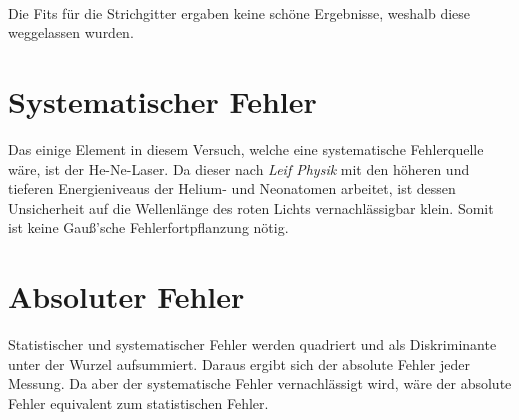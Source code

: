 \\[0.5cm]
Die Fits für die Strichgitter ergaben keine schöne Ergebnisse, weshalb diese weggelassen wurden.

\newpage
\section{Systematischer Fehler}
Das einige Element in diesem Versuch, welche eine systematische Fehlerquelle wäre, ist der He-Ne-Laser. Da dieser nach \textit{Leif Physik} \cite{PhysikkeineAngaben} mit den höheren und tieferen Energieniveaus der Helium- und Neonatomen arbeitet, ist dessen Unsicherheit auf die Wellenlänge des roten Lichts vernachlässigbar klein. Somit ist keine Gauß'sche Fehlerfortpflanzung nötig.
\section{Absoluter Fehler}
Statistischer und systematischer Fehler werden quadriert und als Diskriminante unter der Wurzel aufsummiert. Daraus ergibt sich der absolute Fehler jeder Messung. Da aber der systematische Fehler vernachlässigt wird, wäre der absolute Fehler equivalent zum statistischen Fehler.